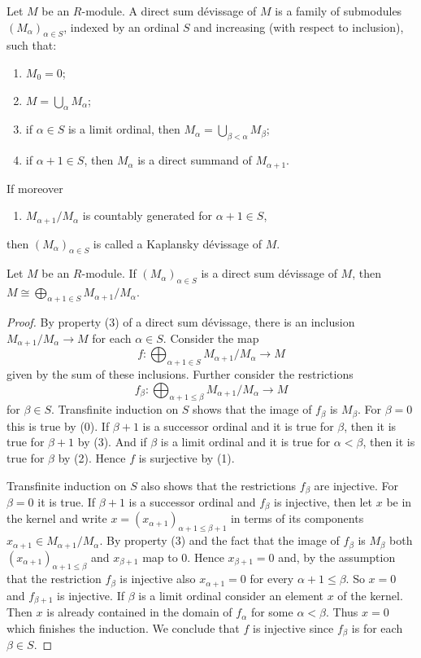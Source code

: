 \begin{definition}[10.84.1]
Let $M$ be an $R$-module. A direct sum d\'evissage of $M$ is a family of submodules $(M_\alpha)_{\alpha\in S}$, indexed by an ordinal $S$ and increasing (with respect to inclusion), such that:
\begin{enumerate}[label=(\arabic*),start=0]
\item $M_0=0$;
\item $M=\bigcup_\alpha M_\alpha$;
\item if $\alpha\in S$ is a limit ordinal, then $M_\alpha=\bigcup_{\beta<\alpha}M_\beta$;
\item if $\alpha+1\in S$, then $M_\alpha$ is a direct summand of $M_{\alpha+1}$.
\end{enumerate}
If moreover
\begin{enumerate}[label=(\arabic*),start=4]
\item $M_{\alpha+1}/M_\alpha$ is countably generated for $\alpha+1\in S$,
\end{enumerate}
then $(M_\alpha)_{\alpha\in S}$ is called a Kaplansky d\'evissage of $M$.
\end{definition}
\begin{lemma}[10.84.2]
Let $M$ be an $R$-module. If $(M_\alpha)_{\alpha\in S}$ is a direct sum d\'evissage of $M$, then $M\cong\bigoplus_{\alpha+1\in S}M_{\alpha+1}/M_\alpha$.
\end{lemma}
\begin{proof}
By property (3) of a direct sum d\'evissage, there is an inclusion $M_{\alpha+1}/M_\alpha\to M$ for each $\alpha\in S$. Consider the map
\[f:\bigoplus_{\alpha+1\in S}M_{\alpha+1}/M_\alpha\to M\]
given by the sum of these inclusions. Further consider the restrictions
\[f_\beta:\bigoplus_{\alpha+1\leq\beta}M_{\alpha+1}/M_\alpha\longrightarrow M\]
for $\beta\in S$. Transfinite induction on $S$ shows that the image of $f_\beta$ is $M_\beta$. For $\beta=0$ this is true by (0). If $\beta+1$ is a successor ordinal and it is true for $\beta$, then it is true for $\beta+1$ by (3). And if $\beta$ is a limit ordinal and it is true for $\alpha<\beta$, then it is true for $\beta$ by (2). Hence $f$ is surjective by (1).

Transfinite induction on $S$ also shows that the restrictions $f_\beta$ are injective. For $\beta=0$ it is true. If $\beta+1$ is a successor ordinal and $f_\beta$ is injective, then let $x$ be in the kernel and write $x=(x_{\alpha+1})_{\alpha+1\leq\beta+1}$ in terms of its components $x_{\alpha+1}\in M_{\alpha+1}/M_\alpha$. By property (3) and the fact that the image of $f_\beta$ is $M_\beta$ both $(x_{\alpha+1})_{\alpha+1\leq\beta}$ and $x_{\beta+1}$ map to $0$. Hence $x_{\beta+1}=0$ and, by the assumption that the restriction $f_\beta$ is injective also $x_{\alpha+1}=0$ for every $\alpha+1\leq\beta$. So $x=0$ and $f_{\beta+1}$ is injective. If $\beta$ is a limit ordinal consider an element $x$ of the kernel. Then $x$ is already contained in the domain of $f_\alpha$ for some $\alpha<\beta$. Thus $x=0$ which finishes the induction. We conclude that $f$ is injective since $f_\beta$ is for each $\beta\in S$.
\end{proof}
